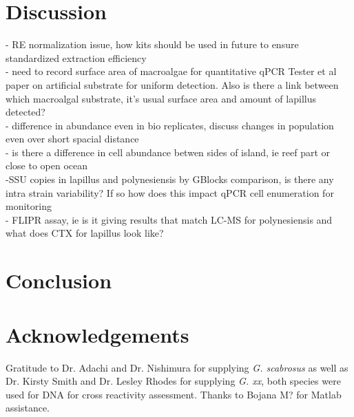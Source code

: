 \documentclass[12pt]{article}
\begin{document}
\section{Discussion}
- RE normalization issue, how kits should be used in future to ensure standardized extraction efficiency\\
- need to record surface area of macroalgae for quantitative qPCR Tester et al paper on artificial substrate for uniform detection. Also is there a link between which macroalgal substrate, it's usual surface area and amount of lapillus detected?\\
- difference in abundance even in bio replicates, discuss changes in population even over short spacial distance\\
- is there a difference in cell abundance betwen sides of island, ie reef part or close to open ocean\\
-SSU copies in lapillus and polynesiensis by GBlocks comparison, is there any intra strain variability? If so how does this impact qPCR cell enumeration for monitoring\\
- FLIPR assay, ie is it giving results that match LC-MS for polynesiensis and what does CTX for lapillus look like?
\newpage
\section{Conclusion}

\section{Acknowledgements}
Gratitude to Dr. Adachi and Dr. Nishimura for supplying \emph{G. scabrosus} as well as Dr. Kirsty Smith and Dr. Lesley Rhodes for supplying \emph{G. xx}, both species were used for DNA for cross reactivity assessment. Thanks to Bojana M? for Matlab assistance.
\FloatBarrier
\newpage


\end{document}
